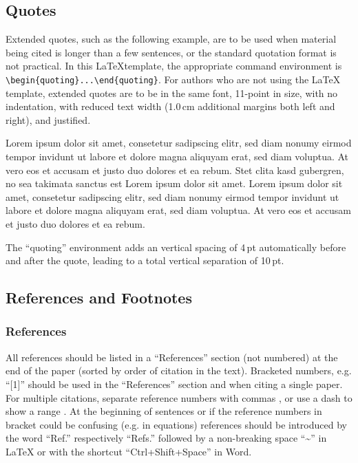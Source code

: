 \documentclass{CEAS_EuroGNC_2024}
\begin{document}
\newpage
\subsection{Quotes}
Extended quotes, such as the following example, are to be used when material being cited is longer than a few sentences, or the standard quotation format is not practical. In this \LaTeX template, the appropriate command environment is \verb|\begin{quoting}...\end{quoting}|. For authors who are not using the \LaTeX{} template, extended quotes are to be in the same font, 11-point in size, with no indentation, with reduced text width (1.0\,cm additional margins both left and right), and justified. 

\begin{quoting}
Lorem ipsum dolor sit amet, consetetur sadipscing elitr, sed diam nonumy eirmod tempor invidunt ut labore et dolore magna aliquyam erat, sed diam voluptua. At vero eos et accusam et justo duo dolores et ea rebum. Stet clita kasd gubergren, no sea takimata sanctus est Lorem ipsum dolor sit amet. Lorem ipsum dolor sit amet, consetetur sadipscing elitr, sed diam nonumy eirmod tempor invidunt ut labore et dolore magna aliquyam erat, sed diam voluptua. At vero eos et accusam et justo duo dolores et ea rebum.
\end{quoting}

The ``quoting'' environment adds an vertical spacing of 4\,pt automatically before and after the quote, leading to a total vertical separation of 10\,pt.

\subsection{References and Footnotes}
\subsubsection{References}

All references should be listed in a ``References'' section (not numbered) at the end of the paper (sorted by order of citation in the text). Bracketed numbers, e.g. ``[1]'' should be used in the ``References'' section and when citing a single paper. For multiple citations, separate reference numbers with commas \cite{ISO1151-3:1989,ISO1151-5:1987}, or use a dash to show a range \cite{ISO1151-3:1989_COR1:1996,ISO1151-4:1994,ISO1151-5:1987}. At the beginning of sentences or if the reference numbers in bracket could be confusing (e.g. in equations) references should be introduced by the word ``Ref.'' respectively ``Refs.'' followed by a non-breaking space ``\textasciitilde'' in \LaTeX{} or with the shortcut ``Ctrl+Shift+Space'' in Word.
\end{document}
